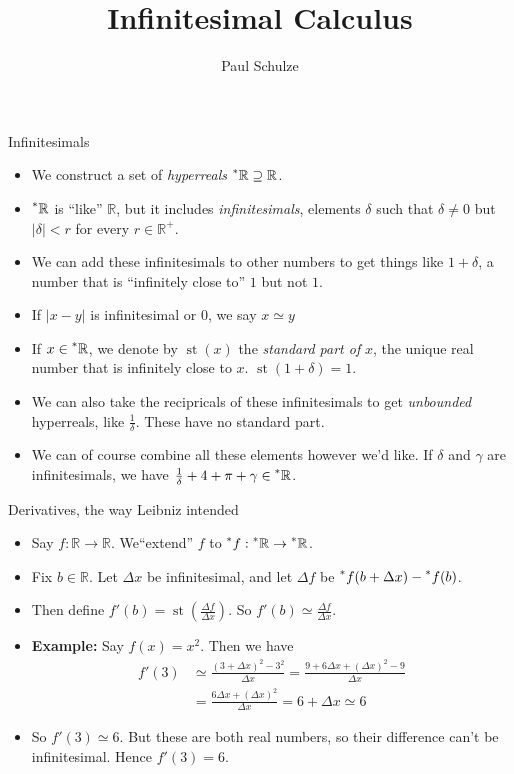 \documentclass{beamer}
\title{Infinitesimal Calculus}
\author{Paul Schulze}
\date{}
\theoremstyle{plain}
\theoremstyle{definition}
\newcommand{\stp}[1]{\st\left(#1\right)}
\newcommand{\reals}{\mathbb{R}}
\newcommand{\hreals}{\prescript{*}{}{\mathbb{R}}}
\newcommand{\hr}[1]{\prescript{*}{}{#1}}
\DeclareMathOperator{\st}{st}
\begin{document}
	
\begin{frame}
	\titlepage
\end{frame}
	
	
\begin{frame}{Infinitesimals}
\begin{itemize}
	\item We construct a set of \textit{hyperreals} $\hreals \supseteq \reals$.
	\item $\hreals$ is ``like'' $\reals$, but it includes \textit{infinitesimals}, elements $\delta$ such that $\delta \neq 0$ but $|\delta| < r$ for every $r \in \reals^+$.
	\item We can add these infinitesimals to other numbers to get things like $1 + \delta$, a number that is ``infinitely close to'' $1$ but not $1$. 
	\item If $|x - y|$ is infinitesimal or $0$, we say $x \simeq y$
	\item If $x \in \hreals$, we denote by $\st(x)$ the \textit{standard part of} $x$, the unique real number that is infinitely close to $x$. $\st(1 + \delta) = 1$. 
	\item We can also take the recipricals of these infinitesimals to get \textit{unbounded} hyperreals, like $\frac{1}{\delta}$. These have no standard part.
	\item We can of course combine all these elements however we'd like. If $\delta$ and $\gamma$ are infinitesimals, we have $\frac{1}{\delta} + 4 + \pi + \gamma \in \hreals$.
\end{itemize}
\end{frame}

\begin{frame}{Derivatives, the way Leibniz intended}
\begin{itemize}
	\item Say $f: \reals \to \reals$. We``extend'' $f$ to $\hr{f}: \hreals \to \hreals$.
	\item Fix $b \in \reals$. Let $\Delta x$ be infinitesimal, and let $\Delta f$ be $\hr{f}(b + \Delta x) - \hr{f}(b)$.
	\item Then define $f'(b) = \stp{\frac{\Delta f}{\Delta x}}$. So $f'(b) \simeq \frac{\Delta f}{\Delta x}$.
	\item \textbf{Example:} Say $f(x) = x^2$. Then we have 
	\begin{align*}
	f'(3) &\simeq \frac{(3 + \Delta x)^2 - 3^2}{\Delta x} = \frac{9 + 6 \Delta x + (\Delta x)^2 - 9}{\Delta x} \\
		&= \frac{6 \Delta x + (\Delta x)^2}{\Delta x} = 6 + \Delta x \simeq 6
	\end{align*}
	\item So $f'(3) \simeq 6$. But these are both real numbers, so their difference can't be infinitesimal. Hence $f'(3) = 6$.
\end{itemize}
\end{frame}
\end{document}
